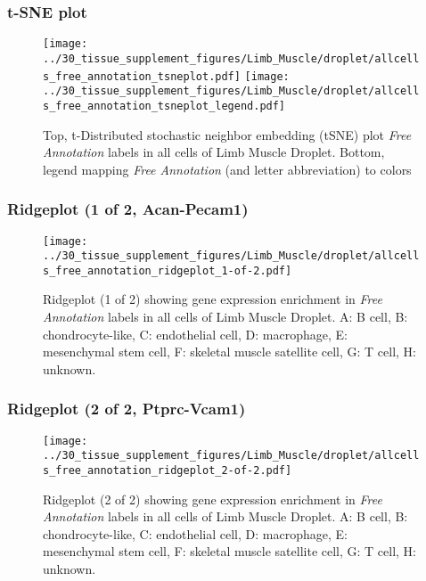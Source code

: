 \subsubsection{t-SNE plot}
\begin{figure}[h]
\centering
\texttt{[image: ../30\_tissue\_supplement\_figures/Limb\_Muscle/droplet/allcells\_free\_annotation\_tsneplot.pdf]}
\texttt{[image: ../30\_tissue\_supplement\_figures/Limb\_Muscle/droplet/allcells\_free\_annotation\_tsneplot\_legend.pdf]}
\caption{Top, t-Distributed stochastic neighbor embedding (tSNE) plot  \emph{Free Annotation} labels in all cells of Limb Muscle Droplet. Bottom, legend mapping \emph{Free Annotation} (and letter abbreviation) to colors}
\end{figure}


\clearpage

\subsubsection{Ridgeplot (1 of 2, Acan-Pecam1)}
\begin{figure}[h]
\centering
\texttt{[image: ../30\_tissue\_supplement\_figures/Limb\_Muscle/droplet/allcells\_free\_annotation\_ridgeplot\_1-of-2.pdf]}

\caption{ Ridgeplot (1 of 2)  showing gene expression enrichment in \emph{Free Annotation} labels in all cells of Limb Muscle Droplet. A: B cell, B: chondrocyte-like, C: endothelial cell, D: macrophage, E: mesenchymal stem cell, F: skeletal muscle satellite cell, G: T cell, H: unknown.}
\end{figure}


\clearpage

\subsubsection{Ridgeplot (2 of 2, Ptprc-Vcam1)}
\begin{figure}[h]
\centering
\texttt{[image: ../30\_tissue\_supplement\_figures/Limb\_Muscle/droplet/allcells\_free\_annotation\_ridgeplot\_2-of-2.pdf]}

\caption{ Ridgeplot (2 of 2)  showing gene expression enrichment in \emph{Free Annotation} labels in all cells of Limb Muscle Droplet. A: B cell, B: chondrocyte-like, C: endothelial cell, D: macrophage, E: mesenchymal stem cell, F: skeletal muscle satellite cell, G: T cell, H: unknown.}
\end{figure}


